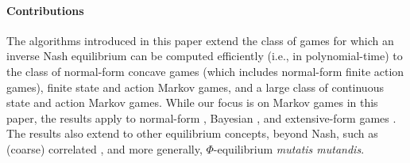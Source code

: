 %
%
\vspace{-2.5mm}
\paragraph{Contributions}    


The algorithms introduced in this paper extend the class of games for which an inverse Nash equilibrium can be computed efficiently (i.e., in polynomial-time) to the class of normal-form concave games (which includes normal-form finite action games), finite state and action Markov games, and a large class of continuous state and action Markov games. 
While our focus is on Markov games in this paper, the results apply to normal-form \citep{nash1950existence}, Bayesian \citep{harsanyi1967games, harsanyi1968bayesian}, and extensive-form games \citep{zermelo1913anwendung}.
The results also extend to other equilibrium concepts, beyond Nash, such as (coarse) correlated \cite{aumann1974subjectivity, moulin1978strategically}, and more generally, $\Phi$-equilibrium \citep{greenwald2003general} \emph{mutatis mutandis}.




